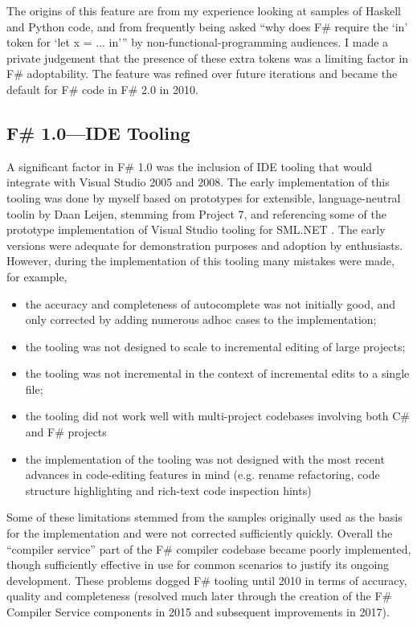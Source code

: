 \documentclass[acmsmall]{acmart}\settopmatter{}
\begin{document}
The origins of this feature are from my experience looking at samples of Haskell and Python code, and from frequently
being asked “why does F\# require the ‘in’ token for ‘let x = ... in’” by non-functional-programming audiences.  I made
a private judgement that the presence of these extra tokens was a limiting factor in F\# adoptability.  The feature was refined
over future iterations and became the default for F\# code in F\# 2.0 in 2010.

\subsection*{F\# 1.0---IDE Tooling}

A significant factor in F\# 1.0 was the inclusion of IDE tooling that would integrate with Visual Studio 2005 and 2008.
The early implementation of this tooling was done by myself based on prototypes for extensible, language-neutral toolin
 by Daan Leijen, stemming from Project 7, and referencing some of the prototype implementation of Visual Studio tooling
for SML.NET \citep{Benton2004}. The early versions were adequate for demonstration purposes and
adoption by enthusiasts.  However, during the implementation of this tooling many mistakes were made, for example, 

\begin{itemize}
\item the accuracy and completeness of autocomplete was not initially good, and only corrected by adding numerous adhoc cases to the implementation;
\item the tooling was not designed to scale to incremental editing of large projects;
\item the tooling was not incremental in the context of incremental edits to a single file;
\item the tooling did not work well with multi-project codebases involving both C\# and F\# projects
\item the implementation of the tooling was not designed with the most recent advances in code-editing features in mind (e.g. rename refactoring, code structure highlighting and rich-text code inspection hints) 
\end{itemize}

Some of these limitations stemmed from the samples originally used as the basis for the implementation and were not
corrected sufficiently quickly.  Overall the “compiler service” part of the F\# compiler codebase became poorly implemented,
though sufficiently effective in use for common scenarios to justify its ongoing development.  These problems
dogged F\# tooling until 2010 in terms of accuracy, quality and completeness (resolved much later
through the creation of the F\# Compiler Service components in 2015 and subsequent improvements in 2017).
\end{document}

